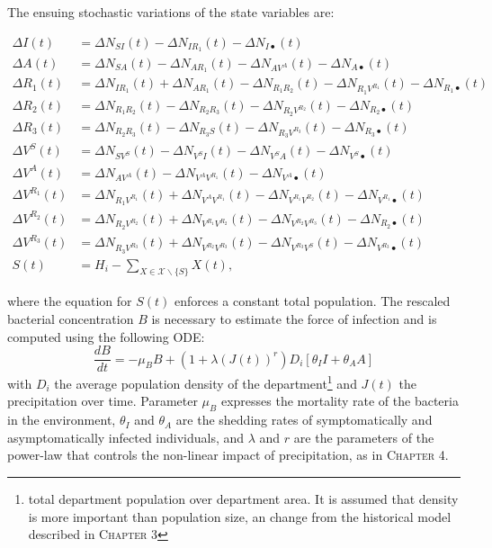 The ensuing stochastic variations of the state variables are:
\begin{fullwidth}
\begingroup
\allowdisplaybreaks
\label{eq:stochstates}
\begin{align}
    \Delta I(t) &= \Delta N_{SI}(t) -  \Delta N_{IR_1}(t) -  \Delta N_{I\bullet}(t)\\
    \Delta A(t) &= \Delta N_{SA}(t) -  \Delta N_{AR_1}(t) -  \Delta N_{AV^A}(t) - \Delta N_{A\bullet}(t)\\
    \Delta R_1(t) &= \Delta N_{IR_1}(t) + \Delta N_{AR_1}(t) -  \Delta N_{R_1 R_2}(t) -  \Delta N_{R_1V^{R_1}}(t) -  \Delta N_{R_1\bullet}(t)\\
    \Delta R_2(t) &= \Delta N_{R_1R_2}(t) - \Delta N_{R_2 R_3}(t) -  \Delta N_{R_2V^{R_2}}(t) -  \Delta N_{R_2\bullet}(t)\\
    \Delta R_3(t) &= \Delta N_{R_2R_3}(t) - \Delta N_{R_3 S}(t) -  \Delta N_{R_3V^{R_3}}(t) -  \Delta N_{R_3\bullet}(t)\\
    \Delta V^S(t) &= \Delta N_{SV^S}(t) -  \Delta N_{V^S I}(t)-  \Delta N_{V^S A}(t) - \Delta N_{V^S\bullet}(t)\\
    \Delta V^A(t) &= \Delta N_{AV^A}(t) -  \Delta N_{V^AV^{R_1}}(t) - \Delta N_{V^A\bullet}(t)\\
    \Delta V^{R_1}(t) &= \Delta N_{R_1V^{R_1}}(t) +  \Delta N_{V^AV^{R_1}}(t) - \Delta N_{V^{R_1}V^{R_2}}(t) - \Delta N_{V^{R_1}\bullet}(t)\\
    \Delta V^{R_2}(t) &=\Delta N_{R_2V^{R_2}}(t)+\Delta N_{V^{R_1} V^{R_2}}(t) -  \Delta N_{V^{R_2}V^{R_3}}(t) -  \Delta N_{R_2\bullet}(t)\\
    \Delta V^{R_3}(t) &= \Delta N_{R_3V^{R_3}}(t)+\Delta N_{V^{R_2}V^{R_3}}(t) - \Delta N_{V^{R_3}V^ S}(t) - \Delta N_{V^{R_3}\bullet}(t)\\
    S(t) &= H_i - \sum_{X \in \mathcal{X} \backslash \{S\}} X(t),
\end{align}
\endgroup
\end{fullwidth}
where the equation for $S(t)$ enforces a constant total population. 
The rescaled bacterial concentration $B$ is necessary to estimate the force of infection and is computed using the following ODE:
\begin{equation}
\frac{dB}{dt} = - \mu_B B +  \left(1 + \lambda\left( J(t)\right)^{r} \right)  D_i \left[\theta_I I + \theta_A A\right] 
\end{equation}
with $D_i$ the average population density of the department\footnote{total department population over department area. It is assumed that density is more important than population size, an change from the historical model described in \textsc{Chapter 3}} and $J(t)$ the precipitation over time. Parameter $\mu_B$ expresses the mortality rate of the bacteria in the environment, $\theta_I$ and $\theta_A$ are the shedding rates of symptomatically and asymptomatically infected individuals, and $\lambda$ and $r$ are the parameters of the power-law that controls the non-linear impact of precipitation, as in \textsc{Chapter 4}.



